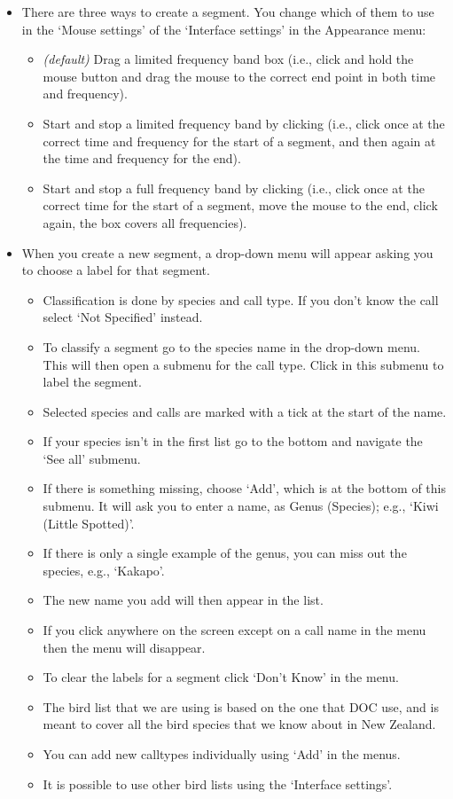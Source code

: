 \documentclass{article}
\begin{document}
\begin{itemize}
\item There are three ways to create a segment. You change which of them to use in the `Mouse settings' of the `Interface settings' in the Appearance menu:
	\begin{itemize}
	\item {\em (default)} Drag a limited frequency band box (i.e., click and hold the mouse button and drag the mouse to the correct end point in both time and frequency).
	\item Start and stop a limited frequency band by clicking (i.e., click once at the correct time and frequency for the start of a segment, and then again at the time and frequency for the end).
	\item Start and stop a full frequency band by clicking (i.e., click once at the correct time for the start of a segment, move the mouse to the end, click again, the box covers all frequencies).
	\end{itemize}
	
\item When you create a new segment, a drop-down menu will appear asking you to choose a label for that segment. 

\begin{itemize}
\item Classification is done by species and call type. If you don't know the call select `Not Specified' instead.
\item To classify a segment go to the species name in the drop-down menu. This will then open a submenu for the call type. Click in this submenu to label the segment.
\item Selected species and calls are marked with a tick at the start of the name.
\item If your species isn't in the first list go to the bottom and navigate the `See all' submenu.
\item If there is something missing, choose `Add', which is at the bottom of this submenu. It will ask you to enter a name, as Genus (Species); e.g., `Kiwi (Little Spotted)'. 
\item If there is only a single example of the genus, you can miss out the species, e.g., `Kakapo'. 
\item The new name you add will then appear in the list. 
\item If you click anywhere on the screen except on a call name in the menu then the menu will disappear. 
\item To clear the labels for a segment click `Don't Know' in the menu.
\item The bird list that we are using is based on the one that DOC use, and is meant to cover all the bird species that we know about in New Zealand. 
\item You can add new calltypes individually using `Add' in the menus.
\item It is possible to use other bird lists using the `Interface settings'.  
\end{itemize}


\end{itemize}
\end{document}
